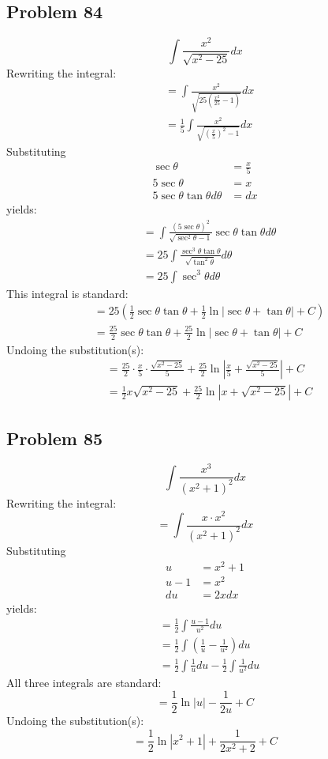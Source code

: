 \documentclass{article}
\begin{document}
\subsection*{Problem 84}
$$\int\frac{x^2}{\sqrt{x^2-25}}dx$$
Rewriting the integral:
\begin{align*}
&=\int\frac{x^2}{\sqrt{25\left(\frac{x^2}{25}-1\right)}}dx \\
&=\frac{1}{5}\int\frac{x^2}{\sqrt{\left(\frac{x}{5}\right)^2-1}}dx
\end{align*}
Substituting
\begin{align*}
\sec\theta&=\frac{x}{5} \\
5\sec\theta&=x \\
5\sec\theta\tan\theta d\theta&=dx
\end{align*}
yields:
\begin{align*}
&=\int\frac{(5\sec\theta)^2}{\sqrt{\sec^2\theta-1}}\sec\theta\tan\theta d\theta \\
&=25\int\frac{\sec^3\theta\tan\theta}{\sqrt{\tan^2\theta}}d\theta \\
&=25\int\sec^3\theta d\theta
\end{align*}
This integral is standard:
\begin{align*}
&=25\left(\frac{1}{2}\sec\theta\tan\theta+\frac{1}{2}\ln\left|\sec\theta+\tan\theta\right|+C\right) \\
&=\frac{25}{2}\sec\theta\tan\theta+\frac{25}{2}\ln\left|\sec\theta+\tan\theta\right|+C
\end{align*}
Undoing the substitution(s):
\begin{align*}
&=\frac{25}{2}\cdot\frac{x}{5}\cdot\frac{\sqrt{x^2-25}}{5}+\frac{25}{2}\ln\left|\frac{x}{5}+\frac{\sqrt{x^2-25}}{5}\right|+C \\
&=\frac{1}{2}x\sqrt{x^2-25}+\frac{25}{2}\ln\left|x+\sqrt{x^2-25}\right|+C
\end{align*}
\subsection*{Problem 85}
$$\int\frac{x^3}{\left(x^2+1\right)^2}dx$$
Rewriting the integral:
$$=\int\frac{x\cdot x^2}{(x^2+1)^2}dx$$
Substituting
\begin{align*}
u&=x^2+1 \\
u-1&=x^2 \\
du&=2xdx
\end{align*}
yields:
\begin{align*}
&=\frac{1}{2}\int\frac{u-1}{u^2}du \\
&=\frac{1}{2}\int\left(\frac{1}{u}-\frac{1}{u^2}\right)du \\
&=\frac{1}{2}\int\frac{1}{u}du-\frac{1}{2}\int\frac{1}{u^2}du
\end{align*}
All three integrals are standard:
$$=\frac{1}{2}\ln|u|-\frac{1}{2u}+C$$
Undoing the substitution(s):
$$=\frac{1}{2}\ln\left|x^2+1\right|+\frac{1}{2x^2+2}+C$$
\end{document}
